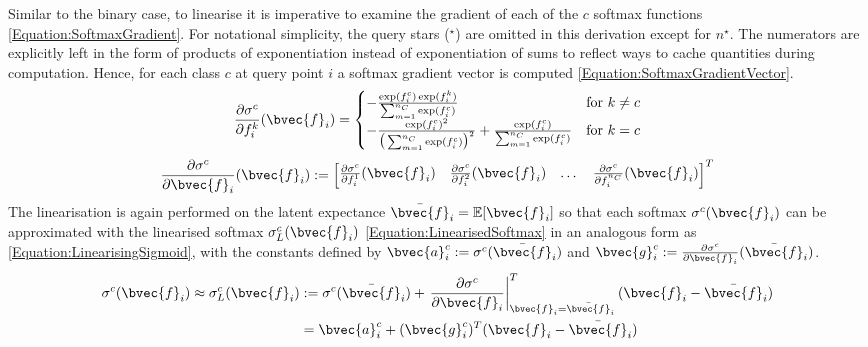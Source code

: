 				Similar to the binary case, to linearise it is imperative to examine the gradient of each of the $c$ softmax functions \eqref{Equation:SoftmaxGradient}. For notational simplicity, the query stars ($^{\star}$) are omitted in this derivation except for $n^{\star}$. The numerators are explicitly left in the form of products of exponentiation instead of exponentiation of sums to reflect ways to cache quantities during computation. Hence, for each class $c$ at query point $i$ a softmax gradient vector is computed \eqref{Equation:SoftmaxGradientVector}. \begin{equation}
					\frac{\partial \sigma^{c}}{\partial f^{k}_{i}}(\bvec{f}_{i}) =
					\begin{cases} 
						- \frac{\exp(f^{c}_{i}) \exp(f^{k}_{i})}{\sum_{m = 1}^{n_{C}} \exp({f^{c}_{i}})} & \text{for } k \neq c  \\
						- \frac{\exp(f^{c}_{i})^{2}}{\big(\sum_{m = 1}^{n_{C}} \exp({f^{c}_{i}})\big)^{2}} + \frac{\exp(f^{c}_{i})}{\sum_{m = 1}^{n_{C}} \exp({f^{c}_{i}})}& \text{for } k = c
					\end{cases}
				\label{Equation:SoftmaxGradient}
				\end{equation} \begin{equation}
					\frac{\partial \sigma^{c}}{\partial \bvec{f}_{i}}(\bvec{f}_{i}) := \begin{bmatrix} \frac{\partial \sigma^{c}}{\partial f^{1}_{i}}(\bvec{f}_{i}) & \frac{\partial \sigma^{c}}{\partial f^{2}_{i}}(\bvec{f}_{i}) & \dots & \frac{\partial \sigma^{c}}{\partial f^{n_{C}}_{i}}(\bvec{f}_{i}) \end{bmatrix}^{T}
				\label{Equation:SoftmaxGradientVector}
				\end{equation} The linearisation is again performed on the latent expectance $\bar{\bvec{f}}_{i} = \mathbb{E}[\bvec{f}_{i}]$ so that each softmax $\sigma^{c}(\bvec{f}_{i})$ can be approximated with the linearised softmax $\sigma^{c}_{L}(\bvec{f}_{i})$ \eqref{Equation:LinearisedSoftmax} in an analogous form as \eqref{Equation:LinearisingSigmoid}, with the constants defined by $\bvec{a}^{c}_{i} := \sigma^{c}(\bar{\bvec{f}}_{i})$ and $\bvec{g}^{c}_{i} := \frac{\partial \sigma^{c}}{\partial \bvec{f}_{i}}(\bar{\bvec{f}}_{i})$. \begin{equation}
					\begin{aligned}
						\sigma^{c}(\bvec{f}_{i}) \approx \sigma^{c}_{L}(\bvec{f}_{i}) & := \sigma^{c}(\bar{\bvec{f}}_{i}) + \left. \frac{\partial \sigma^{c}}{\partial \bvec{f}_{i}} \right|^{T}_{\bvec{f}_{i} = \bar{\bvec{f}}_{i}} (\bvec{f}_{i} - \bar{\bvec{f}}_{i}) \\
						& = \bvec{a}^{c}_{i} + (\bvec{g}^{c}_{i})^{T} (\bvec{f}_{i} - \bar{\bvec{f}}_{i})
					\end{aligned}
				\label{Equation:LinearisedSoftmax}
				\end{equation} 
				
